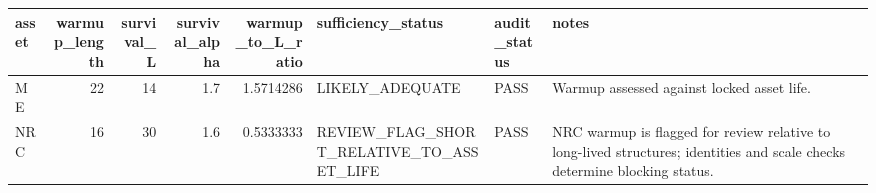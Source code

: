 
\begin{tabular}{lrrrrlll}
\toprule
asset & warmup\_length & survival\_L & survival\_alpha & warmup\_to\_L\_ratio & sufficiency\_status & audit\_status & notes\\
\midrule
ME & 22 & 14 & 1.7 & 1.5714286 & LIKELY\_ADEQUATE & PASS & Warmup assessed against locked asset life.\\
NRC & 16 & 30 & 1.6 & 0.5333333 & REVIEW\_FLAG\_SHORT\_RELATIVE\_TO\_ASSET\_LIFE & PASS & NRC warmup is flagged for review relative to long-lived structures; identities and scale checks determine blocking status.\\
\bottomrule
\end{tabular}
